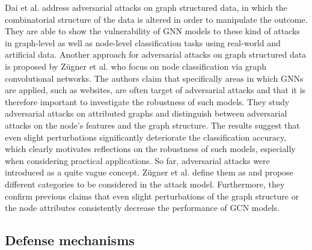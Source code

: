 \documentclass[a4paper,preprint]{sig-alternate}
\begin{document}
Dai et al. \cite{Dai_2018} address adversarial attacks on graph structured data, in which the combinatorial structure of 
the data is altered in order to manipulate the outcome. They are able to show the vulnerability of GNN models to these kind of attacks
in graph-level as well as node-level classification tasks using real-world and artificial data.\newline
Another approach for adversarial attacks on graph structured data is proposed by Zügner et al. \cite{Zuegner_2018} who focus on node classification
via graph convolutional networks. The authors claim that specifically areas in which GNNs are applied, such as websites, are often target of
adversarial attacks and that it is therefore important to investigate the robustness of such models. They study adversarial attacks on attributed graphs 
and distinguish between adversarial attacks on the node's features and the graph structure.
The results suggest that even slight perturbations significantly deteriorate the classification accuracy, which clearly motivates reflections
on the robustness of such models, especially when considering practical applications.\newline
So far, adversarial attacks were introduced as a quite vague concept. Zügner et al. \cite{zuegner2019adversarial}
define them as 
and propose different categories to be considered in the attack model. Furthermore, they confirm previous claims that 
even slight perturbations of the graph structure or the node attributes consistently decrease the performance of GCN models.

\subsection{Defense mechanisms}
\label{sec:rev2}
\end{document}
